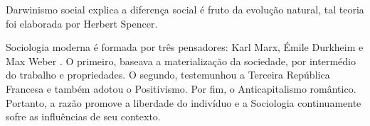 Darwinismo social explica a diferença social é fruto da evolução natural, tal teoria foi elaborada por Herbert Spencer.

Sociologia moderna é formada por três pensadores: Karl Marx, Émile Durkheim e Max Weber \cite{quintaneiro2003toque}. 
O primeiro, baseava a materialização da sociedade, por intermédio do trabalho e propriedades.
O segundo, testemunhou a Terceira República Francesa e também adotou o Positivismo. 
Por fim, o  Anticapitalismo romântico.
Portanto, a razão promove a liberdade do indivíduo e a Sociologia continuamente sofre as influências de seu contexto.
